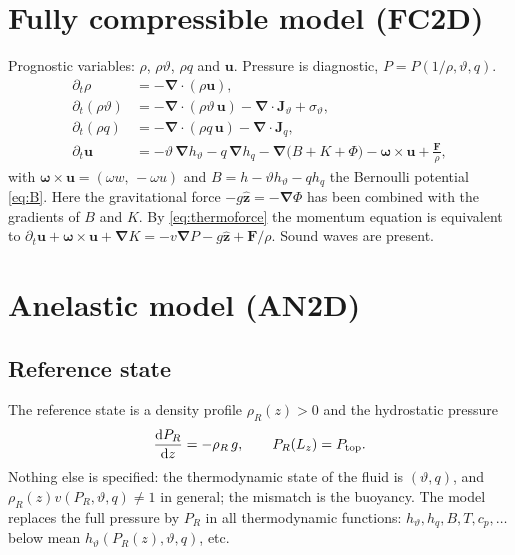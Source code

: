 \documentclass[11pt,a4paper]{article}
\newcommand{\vt}{\vartheta}                    %
\newcommand{\hth}{{h_{\vartheta}}}               %
\newcommand{\hq}{{h_q}}                          %
\newcommand{\bu}{\mathbf{u}}
\newcommand{\ez}{\hat{\mathbf{z}}}
\newcommand{\bJ}{\mathbf{J}}
\newcommand{\bF}{\mathbf{F}}
\newcommand{\bnabla}{\boldsymbol{\nabla}}
\newcommand{\bomega}{\boldsymbol{\omega}}
\begin{document}
\section{Fully compressible model (FC2D)}\label{sec:fc}
Prognostic variables: $\rho$, $\rho\vt$, $\rho q$ and $\bu$. Pressure is diagnostic, $P=P(1/\rho,\vt,q)$.
\begin{subequations}\label{eq:fc}
\begin{align}
  \partial_t\rho &= -\bnabla\!\cdot(\rho\bu),\\
  \partial_t(\rho\vt) &= -\bnabla\!\cdot(\rho\vt\,\bu) - \bnabla\!\cdot\bJ_\vt + \sigma_\vt,\\
  \partial_t(\rho q) &= -\bnabla\!\cdot(\rho q\,\bu) - \bnabla\!\cdot\bJ_q,\\
  \partial_t\bu &= -\vt\,\bnabla\hth - q\,\bnabla\hq - \bnabla\big(B+K+\Phi\big) - \bomega\times\bu + \frac{\bF}{\rho},
  \label{eq:fc-mom}
\end{align}
\end{subequations}
with $\bomega\times\bu=(\omega w,\,-\omega u)$ and $B=h-\vt\hth-q\hq$ the Bernoulli potential \eqref{eq:B}. Here the gravitational force $-g\ez=-\bnabla\Phi$ has been combined with the gradients of $B$ and $K$. By \eqref{eq:thermoforce} the momentum equation is equivalent to
$\partial_t\bu+\bomega\times\bu+\bnabla K=-v\bnabla P-g\ez+\bF/\rho$. Sound waves are present.

\section{Anelastic model (AN2D)}\label{sec:an}
\subsection{Reference state}
The reference state is a density profile $\rho_R(z)>0$ and the hydrostatic pressure
\begin{equation}
  \frac{\mathrm{d}P_R}{\mathrm{d}z}=-\rho_R\,g,\qquad P_R(L_z)=P_{\rm top}.
\end{equation}
Nothing else is specified: the thermodynamic state of the fluid is $(\vt,q)$, and $\rho_R(z)v(P_R,\vt,q)\neq1$ in general; the
mismatch is the buoyancy. The model replaces the full pressure by $P_R$ in all thermodynamic functions:
$\hth,\hq,B,T,c_p,\ldots$ below mean $\hth(P_R(z),\vt,q)$, etc.
\end{document}
